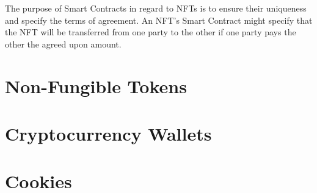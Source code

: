 The purpose of Smart Contracts in regard to NFTs is to ensure their uniqueness and specify the terms of agreement. An NFT's Smart Contract might specify that the NFT will be transferred from one party to the other if one party pays the other the agreed upon amount.


%
%
\section{Non-Fungible Tokens}
\label{sec:background:nfts}


%
%
\section{Cryptocurrency Wallets}
\label{sec:background:wallets}


%
%
\section{Cookies}
\label{sec:background:cookies}



